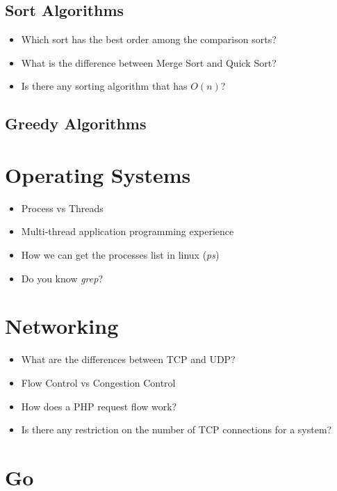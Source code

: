 \documentclass[]{book}
\begin{document}
\subsection{Sort Algorithms}

\begin{itemize}
  \item Which sort has the best order among the comparison sorts?
  \item What is the difference between Merge Sort and Quick Sort?
  \item Is there any sorting algorithm that has $O(n)$?
\end{itemize}

\subsection{Greedy Algorithms}

\section{Operating Systems}
\begin{itemize}
  \item Process vs Threads
  \item Multi-thread application programming experience
  \item How we can get the processes list in linux (\textit{ps})
  \item Do you know \textit{grep}?
\end{itemize}

\section{Networking}
\begin{itemize}
  \item What are the differences between TCP and UDP\@?
  \item Flow Control vs Congestion Control
  \item How does a PHP request flow work?
  \item Is there any restriction on the number of TCP connections for a system?
\end{itemize}

\section{Go}
\end{document}
